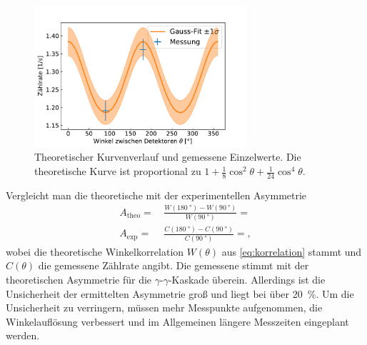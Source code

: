 	\begin{figure}[ht]
		\centering
		\includegraphics[width=0.7\textwidth]{dat/theoKurve.pdf}
		\caption{Theoretischer Kurvenverlauf und gemessene Einzelwerte.
			Die theoretische Kurve ist proportional zu $1 + \frac{1}{8} \cos^2 \theta + \frac{1}{24} \cos^4 \theta$.}
		\label{fig:theoKurve}
	\end{figure}

	Vergleicht man die theoretische mit der experimentellen Asymmetrie
	\begin{align*}
		A_\text{theo} =&\, \frac{W(\SI{180}{\degree}) - W(\SI{90}{\degree})}{W(\SI{90}{\degree})} =  \\
		A_\text{exp} =&\, \frac{C(\SI{180}{\degree}) - C(\SI{90}{\degree})}{C(\SI{90}{\degree})} = ,
	\end{align*}
	wobei die theoretische Winkelkorrelation $W(\theta)$ aus \cref{eq:korrelation} stammt und $C(\theta)$ die gemessene Zählrate angibt.
	Die gemessene stimmt mit der theoretischen Asymmetrie für die $\gamma$-$\gamma$-Kaskade überein.
	Allerdings ist die Unsicherheit der ermittelten Asymmetrie groß und liegt bei über \SI{20}{\percent}.
	Um die Unsicherheit zu verringern, müssen mehr Messpunkte aufgenommen, die Winkelauflösung verbessert und im Allgemeinen längere Messzeiten eingeplant werden.
	